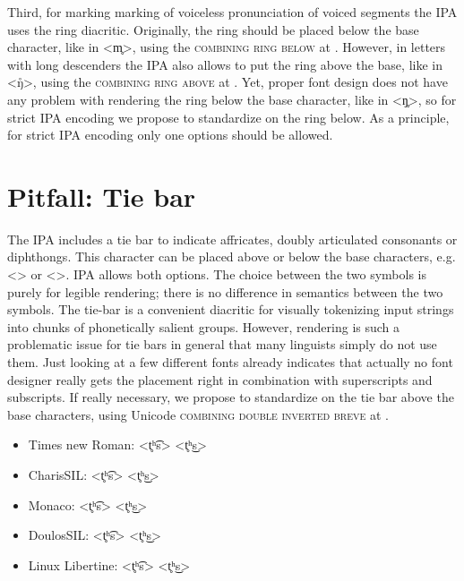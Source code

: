 Third, for marking marking of voiceless pronunciation of voiced segments the IPA
uses the ring diacritic. Originally, the ring should be placed below the 
base character, like in <m̥>, using the \textsc{combining ring below} at . 
However, in letters with long descenders the IPA also allows to put the ring 
above the base, like in <ŋ̊>, using the \textsc{combining ring above} at 
. Yet, proper font design does not have any problem with rendering 
the ring below the base character, like in <ŋ̥>, so for strict IPA encoding we 
propose to standardize on the ring below. As a principle, for strict IPA 
encoding only one options should be allowed.

\section{Pitfall: Tie bar}
\label{pitfall-tie-bar}

The IPA includes a tie bar to indicate affricates, doubly articulated consonants
or diphthongs. This character can be placed above or below the base characters,
e.g. <> or <>. IPA allows both options. The choice
between the two symbols is purely for legible rendering; there is no difference
in semantics between the two symbols. The tie-bar is a convenient diacritic for
visually tokenizing input strings into chunks of phonetically salient groups.
However, rendering is such a problematic issue for tie bars in general that many
linguists simply do not use them. Just looking at a few different fonts already
indicates that actually no font designer really gets the placement right in
combination with superscripts and subscripts. If really necessary, we propose to
standardize on the tie bar above the base characters, using Unicode
\textsc{combining double inverted breve} at .

\begin{itemize}
  \item[] {Times new Roman: <t̥ʰ͡s> <t̥ʰ͜s>}
  \item[] {\small {}CharisSIL: <t̥ʰ͡s> <t̥ʰ͜s>}
  \item[] {\footnotesize {}Monaco: <t̥ʰ͡s> <t̥ʰ͜s>}
  \item[] {DoulosSIL: <t̥ʰ͡s> <t̥ʰ͜s>}
  \item[] Linux Libertine: <t̥ʰ͡s> <t̥ʰ͜s>
\end{itemize}

